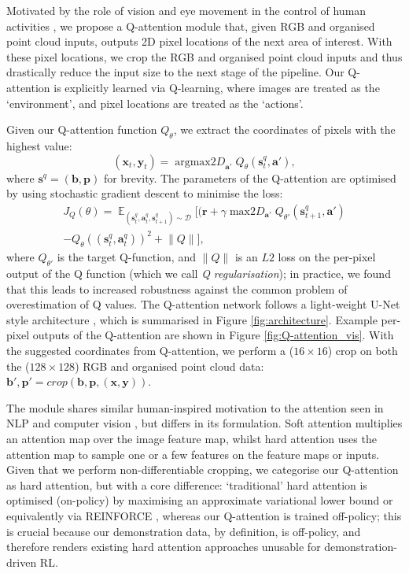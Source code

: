 \documentclass[letterpaper, 10 pt, journal, twoside]{IEEEtran}
\newcommand{\bx}{\mathbf{x}}
\newcommand{\by}{\mathbf{y}}
\newcommand{\bs}{\mathbf{s}}
\newcommand{\ba}{\mathbf{a}}
\newcommand{\br}{\mathbf{r}}
\newcommand{\st}{\bs_t}
\newcommand{\at}{\ba_t}
\newcommand{\stp}{\bs_{t+1}}
\newcommand{\qattn}{Q}
\newcommand{\qattnp}{\theta}
\newcommand{\rgb}{\mathbf{b}}
\newcommand{\pcd}{\mathbf{p}}
\newcommand{\replay}{\mathcal{D}}
\DeclareMathOperator*{\E}{\mathbb{E}}
\DeclareMathOperator*{\argmaxtwod}{argmax\textit{2D}}
\DeclareMathOperator*{\maxtwod}{max\textit{2D}}
\begin{document}
Motivated by the role of vision and eye movement in the control of human activities \cite{land1999roles}, we propose a Q-attention module that, given RGB and organised point cloud inputs, outputs 2D pixel locations of the next area of interest. With these pixel locations, we crop the RGB and organised point cloud inputs and thus drastically reduce the input size to the next stage of the pipeline. Our Q-attention is explicitly learned via Q-learning, where images are treated as the `environment', and pixel locations are treated as the `actions'.

Given our Q-attention function $\qattn_\qattnp$, we extract the coordinates of pixels with the highest value:
\begin{equation}
\label{eq:qatentionxy}
(\bx_t, \by_t) = \argmaxtwod_{\ba'} \qattn_{\qattnp}(\st^q, \ba'),
\end{equation}
where $\bs^q = (\rgb, \pcd)$ for brevity. The parameters of the Q-attention are optimised by using stochastic gradient descent to minimise the loss:
\begin{multline}
J_{\qattn}(\qattnp) = \E_{(\st^q, \at^q, \stp^q) \sim \replay} [ (\br + \gamma \maxtwod_{\ba'}\qattn_{\qattnp'}(\stp^q, \ba') \\ - \qattn_{\qattnp}((\st^q, \at^q))^2 + \lVert \qattn \rVert],
\end{multline}
where $\qattn_{\qattnp'}$ is the target Q-function, and $\lVert \qattn \rVert$ is an $L2$ loss on the per-pixel output of the Q function (which we call \textit{Q regularisation}); in practice, we found that this leads to increased robustness against the common problem of overestimation of Q values. The Q-attention network follows a light-weight U-Net style architecture \cite{ronneberger2015u}, which is summarised in Figure \ref{fig:architecture}. Example per-pixel outputs of the Q-attention are shown in Figure \ref{fig:Q-attention_vis}. With the suggested coordinates from Q-attention, we perform a ($16 \times 16$) crop on both the ($128 \times 128$) RGB and organised point cloud data: $\rgb', \pcd' = crop(\rgb, \pcd, (\bx, \by))$.

The module shares similar human-inspired motivation to the attention seen in NLP \cite{bahdanau2014neural, vaswani2017attention, devlin2018bert} and computer vision \cite{xu2015show, zhang2019self}, but differs in its formulation. Soft attention multiplies an attention map over the image feature map, whilst hard attention uses the attention map to sample one or a few features on the feature maps or inputs. Given that we perform non-differentiable cropping, we categorise our Q-attention as hard attention, but with a core difference: `traditional' hard attention is optimised (on-policy) by maximising an approximate variational lower bound or equivalently via REINFORCE \cite{williams1992simple}, whereas our Q-attention is trained off-policy; this is crucial because our demonstration data, by definition, is off-policy, and therefore renders existing hard attention approaches unusable for demonstration-driven RL.
\end{document}
